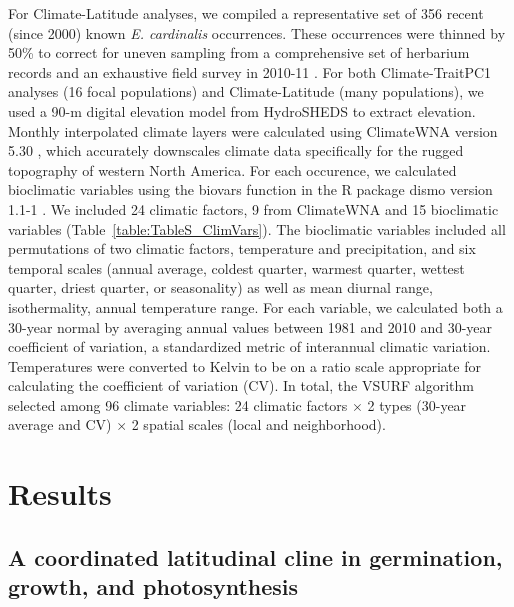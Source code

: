\documentclass[11pt, oneside]{article}
\newcommand{\pkg}[1]{{\fontseries{b}\selectfont #1}}
\begin{document}
For Climate-Latitude analyses, we compiled a representative set of 356 recent (since 2000) known \textit{E. cardinalis} occurrences. These occurrences were thinned by 50\% to correct for uneven sampling from a comprehensive set of herbarium records and an exhaustive field survey in 2010-11 \citep{Angert_ENM}. For both Climate-TraitPC1 analyses (16 focal populations) and Climate-Latitude (many populations), we used a 90-m digital elevation model from HydroSHEDS \citep{Lehner_etal_2006} to extract elevation. Monthly interpolated climate layers were calculated using ClimateWNA version 5.30 \citep{Wang_etal_2012}, which accurately downscales climate data specifically for the rugged topography of western North America. For each occurence, we calculated bioclimatic variables using the biovars function in the R package \pkg{dismo} version 1.1-1 \citep{Hijmans_etal_2016}. We included 24 climatic factors, 9 from ClimateWNA and 15 bioclimatic variables (Table~\ref{table:TableS_ClimVars}). The bioclimatic variables included all permutations of two climatic factors, temperature and precipitation, and six temporal scales (annual average, coldest quarter, warmest quarter, wettest quarter, driest quarter, or seasonality) as well as mean diurnal range, isothermality, annual temperature range. For each variable, we calculated both a 30-year normal by averaging annual values between 1981 and 2010 and 30-year coefficient of variation, a standardized metric of interannual climatic variation. Temperatures were converted to Kelvin to be on a ratio scale appropriate for calculating the coefficient of variation (CV). In total, the VSURF algorithm selected among 96 climate variables: 24 climatic factors $\times$ 2 types (30-year average and CV) $\times$ 2 spatial scales (local and neighborhood).


\section*{Results}

\subsection*{A coordinated latitudinal cline in germination, growth, and photosynthesis}
\end{document}
